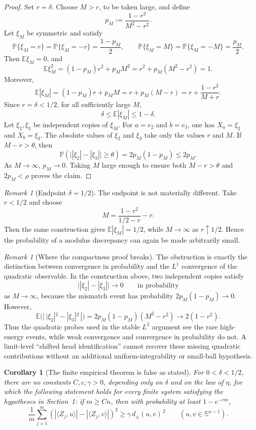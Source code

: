 \documentclass[11pt]{amsart}
\numberwithin{equation}{section}
\newtheorem{corollary}[theorem]{Corollary}
\theoremstyle{definition}
\theoremstyle{remark}
\newtheorem{remark}[theorem]{Remark}
\newcommand{\E}{\mathbb E}
\newcommand{\Prob}{\mathbb P}
\newcommand{\Sph}{\mathbb S}
\newcommand{\distpm}[2]{d_{\pm}(#1,#2)}
\begin{document}
\begin{proof}
Set \(r=\delta\).  Choose \(M>r\), to be taken large, and define
\[
        p_M:=\frac{1-r^2}{M^2-r^2}.
\]
Let \(\xi_M\) be symmetric and satisfy
\[
\Prob\{\xi_M=r\}=\Prob\{\xi_M=-r\}=\frac{1-p_M}{2},
\qquad
\Prob\{\xi_M=M\}=\Prob\{\xi_M=-M\}=\frac{p_M}{2}.
\]
Then \(\E\xi_M=0\), and
\[
\E\xi_M^2=(1-p_M)r^2+p_M M^2
        =r^2+p_M(M^2-r^2)=1.
\]
Moreover,
\[
\E|\xi_M|
=(1-p_M)r+p_M M
=r+p_M(M-r)
=r+\frac{1-r^2}{M+r}.
\]
Since \(r=\delta<1/2\), for all sufficiently large \(M\),
\[
        \delta\le \E|\xi_M|\le 1-\delta .
\]
Let \(\xi_2,\xi_3\) be independent copies of \(\xi_M\).  For \(a=e_2\) and
\(b=e_3\), one has \(X_a=\xi_2\) and \(X_b=\xi_3\).  The absolute values of
\(\xi_2\) and \(\xi_3\) take only the values \(r\) and \(M\).  If
\(M-r>\theta\), then
\[
\Prob\left(\bigl||\xi_2|-|\xi_3|\bigr|\ge\theta\right)
=2p_M(1-p_M)\le 2p_M.
\]
As \(M\to\infty\), \(p_M\to0\).  Taking \(M\) large enough to ensure both
\(M-r>\theta\) and \(2p_M<\rho\) proves the claim.
\end{proof}

\begin{remark}[Endpoint \(\delta=1/2\)]
The endpoint is not materially different.  Take \(r<1/2\) and choose
\[
        M=\frac{1-r^2}{1/2-r}-r.
\]
Then the same construction gives \(\E|\xi_M|=1/2\), while \(M\to\infty\) as
\(r\uparrow1/2\).  Hence the probability of a modulus discrepancy can again be
made arbitrarily small.
\end{remark}

\begin{remark}[Where the compactness proof breaks]\label{rem:break}
The obstruction is exactly the distinction between convergence in probability
and the \(L^1\) convergence of the quadratic observable.  In the construction
above, two independent copies satisfy
\[
\bigl||\xi_2|-|\xi_3|\bigr|\longrightarrow0
\qquad\text{in probability}
\]
as \(M\to\infty\), because the mismatch event has probability
\(2p_M(1-p_M)\to0\).  However,
\[
\E\bigl(|\,|\xi_2|^2-|\xi_3|^2\,|\bigr)
=2p_M(1-p_M)(M^2-r^2)
\longrightarrow 2(1-r^2).
\]
Thus the quadratic probes used in the stable \(L^2\) argument see the rare
high-energy events, while weak convergence and convergence in probability do
not.  A limit-level ``shifted head identification'' cannot recover these
missing quadratic contributions without an additional uniform-integrability or
small-ball hypothesis.
\end{remark}

\begin{corollary}[The finite empirical theorem is false as stated]
\label{cor:finite-false}
For \(0<\delta<1/2\), there are no constants \(C,c,\gamma>0\), depending only
on \(\delta\) and on the law of \(\eta\), for which the following statement
holds for every finite system satisfying the hypotheses in Section~1:
if \(m\ge Cn\), then with probability at least \(1-e^{-cm}\),
\[
\frac1m\sum_{j=1}^m
\left(
  |\langle Z_j,u\rangle|-|\langle Z_j,v\rangle|
\right)^2
\ge
\gamma\,\distpm{u}{v}^{\,2}
\qquad(u,v\in\Sph^{n-1}).
\]
\end{corollary}
\end{document}

